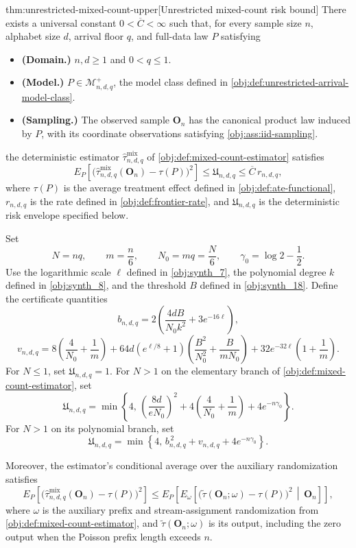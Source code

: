 \documentclass[11pt]{article}
\begin{document}
\begin{theoremv}{thm:unrestricted-mixed-count-upper}[Unrestricted mixed-count risk bound]
There exists a universal constant \(0<\overline C<\infty\) such that, for every sample size \(n\), alphabet size \(d\), arrival floor \(q\), and full-data law \(P\) satisfying
\begin{itemize}
\item \textbf{(Domain.)} \(n,d\ge1\) and \(0<q\le1\).
\item \textbf{(Model.)} \(P\in\mathcal M^{+}_{n,d,q}\), the model class defined in \cref{obj:def:unrestricted-arrival-model-class}.
\item \textbf{(Sampling.)} The observed sample \(\mathbf O_n\) has the canonical product law induced by \(P\), with its coordinate observations satisfying \cref{obj:ass:iid-sampling}.
\end{itemize}
the deterministic estimator \(\widehat\tau^{\mathrm{mix}}_{n,d,q}\) of \cref{obj:def:mixed-count-estimator} satisfies
\[
E_P\!\left[
 \bigl(\widehat\tau^{\mathrm{mix}}_{n,d,q}(\mathbf O_n)-\tau(P)\bigr)^2
\right]
\le \mathfrak U_{n,d,q}
\le \overline C\,r_{n,d,q},
\]
where \(\tau(P)\) is the average treatment effect defined in \cref{obj:def:ate-functional}, \(r_{n,d,q}\) is the rate defined in \cref{obj:def:frontier-rate}, and \(\mathfrak U_{n,d,q}\) is the deterministic risk envelope specified below.

Set
\[
N=nq,\qquad m=\frac n6,\qquad N_0=mq=\frac N6,
\qquad \gamma_0=\log 2-\frac12.
\]
Use the logarithmic scale \(\ell\) defined in \cref{obj:synth_7}, the polynomial degree \(k\) defined in \cref{obj:synth_8}, and the threshold \(B\) defined in \cref{obj:synth_18}. Define the certificate quantities
\[
b_{n,d,q}
=2\left(\frac{4dB}{N_0k^2}+3e^{-16\ell}\right),
\]
\[
v_{n,d,q}
=8\left(\frac4{N_0}+\frac1m\right)
+64d\left(e^{\ell/8}+1\right)
 \left(\frac{B^2}{N_0^2}+\frac{B}{mN_0}\right)
+32e^{-32\ell}\left(1+\frac1m\right).
\]
For \(N\le1\), set \(\mathfrak U_{n,d,q}=1\). For \(N>1\) on the elementary branch of \cref{obj:def:mixed-count-estimator}, set
\[
\mathfrak U_{n,d,q}
=\min\left\{
4,\,
\left(\frac{8d}{eN_0}\right)^2
+4\left(\frac4{N_0}+\frac1m\right)
+4e^{-n\gamma_0}
\right\}.
\]
For \(N>1\) on its polynomial branch, set
\[
\mathfrak U_{n,d,q}
=\min\left\{
4,\,
b_{n,d,q}^{\,2}+v_{n,d,q}+4e^{-n\gamma_0}
\right\}.
\]

Moreover, the estimator's conditional average over the auxiliary randomization satisfies
\[
E_P\!\left[
 \bigl(\widehat\tau^{\mathrm{mix}}_{n,d,q}(\mathbf O_n)-\tau(P)\bigr)^2
\right]
\le
E_P\!\left[
 E_{\omega}\!\left[
  \bigl(\widetilde\tau(\mathbf O_n;\omega)-\tau(P)\bigr)^2
  \,\middle|\,\mathbf O_n
 \right]
\right],
\]
where \(\omega\) is the auxiliary prefix and stream-assignment randomization from \cref{obj:def:mixed-count-estimator}, and \(\widetilde\tau(\mathbf O_n;\omega)\) is its output, including the zero output when the Poisson prefix length exceeds \(n\).
\end{theoremv}
\end{document}
